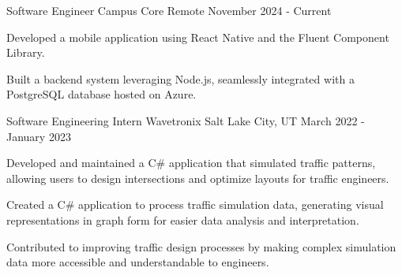 \begin{cventries}

\cventry
{Software Engineer} %
{Campus Core} %
{Remote} %
{November 2024 - Current} %
{ %
\begin{cvitems}
\item {Developed a mobile application using React Native and the Fluent Component Library.}
\item {Built a backend system leveraging Node.js, seamlessly integrated with a PostgreSQL database hosted on Azure.}
\end{cvitems}
}


\cventry
{Software Engineering Intern} %
{Wavetronix} %
{Salt Lake City, UT} %
{March 2022 - January 2023} %
{ %
\begin{cvitems}
\item {Developed and maintained a C\# application that simulated traffic patterns, allowing users to design intersections and optimize layouts for traffic engineers.}
\item {Created a C\# application to process traffic simulation data, generating visual representations in graph form for easier data analysis and interpretation.}
\item {Contributed to improving traffic design processes by making complex simulation data more accessible and understandable to engineers.}
\end{cvitems}
}


\end{cventries}